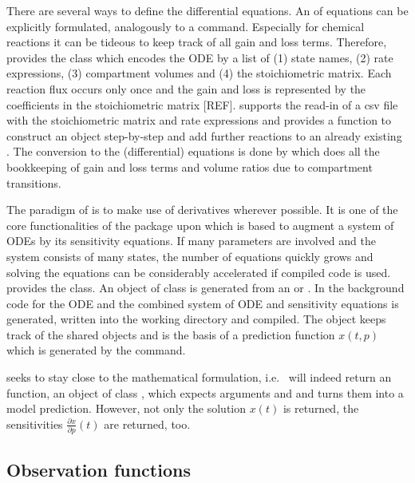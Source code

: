\documentclass[article]{jss}
\begin{document}
There are several ways to define the differential equations. An  of equations can be explicitly formulated, analogously to a  command. Especially for chemical reactions it can be tideous to keep track of all gain and loss terms. Therefore,  provides the  class which encodes the ODE by a list of (1) state names, (2) rate expressions, (3) compartment volumes and (4) the stoichiometric matrix. Each reaction flux occurs only once and the gain and loss is represented by the coefficients in the stoichiometric matrix [REF].  supports the read-in of a csv file with the stoichiometric matrix and rate expressions and provides a function  to construct an  object step-by-step and add further reactions to an already existing . The conversion to the (differential) equations is done by  which does all the bookkeeping of gain and loss terms and volume ratios due to compartment transitions.

The paradigm of  is to make use of derivatives wherever possible. It is one of the core functionalities of the  package upon which  is based to augment a system of ODEs by its sensitivity equations. If many parameters are involved and the system consists of many states, the number of equations quickly grows and solving the equations can be considerably accelerated if compiled code is used.  provides the  class. An object of class  is generated from an  or . In the background  code for the ODE and the combined system of ODE and sensitivity equations is generated, written into the working directory and compiled. The  object keeps track of the shared objects and is the basis of a prediction function $x(t, p)$ which is generated by the  command.

 seeks to stay close to the mathematical formulation, i.e.~ will indeed return an  function, an object of class , which expects arguments  and  and turns them into a model prediction. However, not only the solution $x(t)$ is returned, the sensitivities $\frac{\partial x}{\partial p}(t)$ are returned, too.

\subsection{Observation functions}
\end{document}
